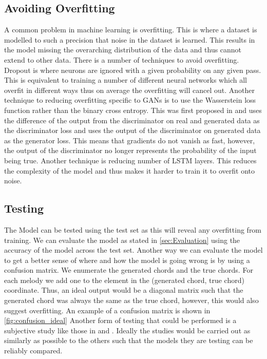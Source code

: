 \subsection{Avoiding Overfitting}
A common problem in machine learning is overfitting. This is where a dataset is modelled to such a precision that noise in the dataset is learned.
This results in the model missing the overarching distribution of the data and thus cannot extend to other data.
There is a number of techniques to avoid overfitting.
Dropout is where neurons are ignored with a given probability on any given pass. 
This is equivalent to training a number of different neural networks which all overfit in different ways thus on average the overfitting will cancel out.
Another technique to reducing overfitting specific to GANs is to use the Wasserstein loss function rather than the binary cross entropy. 
This was first proposed in \cite{Wasserstein} and uses the difference of the output from the discriminator on real and generated data as the discriminator loss and uses the output of the discriminator on generated data as the generator loss.
This means that gradients do not vanish as fast, however, the output of the discriminator no longer represents the probability of the input being true.
Another technique is reducing number of LSTM layers. 
This reduces the complexity of the model and thus makes it harder to train it to overfit onto noise.


\subsection{Testing}
The Model can be tested using the test set as this will reveal any overfitting from training. 
We can evaluate the model as stated in \autoref{sec:Evaluation} using the accuracy of the model across the test set.
Another way we can evaluate the model to get a better sense of where and how the model is going wrong is by using a confusion matrix.
We enumerate the generated chords and the true chords. 
For each melody we add one to the element in the (generated chord, true chord) coordinate. 
Thus, an ideal output would be a diagonal matrix such that the generated chord was always the same as the true chord, however, this would also suggest overfitting.
An example of a confusion matrix is shown in \autoref{fig:confusion_ideal}
Another form of testing that could be performed is a subjective study like those in \cite{MySong} and \cite{BLSTM}.
Ideally the studies would be carried out as similarly as possible to the others such that the models they are testing can be reliably compared.

